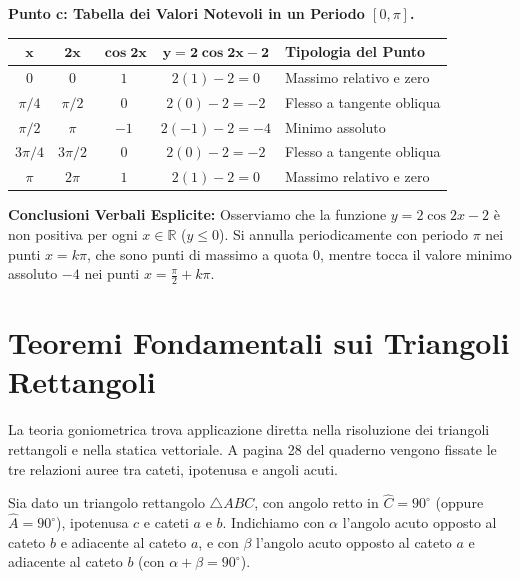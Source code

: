 \documentclass[11pt,a4paper,oneside]{report}
\begin{document}
\begin{dimostrazione}
\textbf{Punto c: Tabella dei Valori Notevoli in un Periodo $[0, \pi]$.}
\begin{center}
\begin{tabular}{c|c|c|c|l}
\toprule
$\mathbf{x}$ & $\mathbf{2x}$ & $\mathbf{\cos 2x}$ & $\mathbf{y = 2\cos 2x - 2}$ & \textbf{Tipologia del Punto} \\
\midrule
$0$ & $0$ & $1$ & $2(1) - 2 = 0$ & Massimo relativo e zero \\
$\pi/4$ & $\pi/2$ & $0$ & $2(0) - 2 = -2$ & Flesso a tangente obliqua \\
$\pi/2$ & $\pi$ & $-1$ & $2(-1) - 2 = -4$ & Minimo assoluto \\
$3\pi/4$ & $3\pi/2$ & $0$ & $2(0) - 2 = -2$ & Flesso a tangente obliqua \\
$\pi$ & $2\pi$ & $1$ & $2(1) - 2 = 0$ & Massimo relativo e zero \\
\bottomrule
\end{tabular}
\end{center}

\textbf{Conclusioni Verbali Esplicite:}
Osserviamo che la funzione $y = 2\cos 2x - 2$ è non positiva per ogni $x \in \mathbb{R}$ ($y \le 0$). Si annulla periodicamente con periodo $\pi$ nei punti $x = k\pi$, che sono punti di massimo a quota $0$, mentre tocca il valore minimo assoluto $-4$ nei punti $x = \frac{\pi}{2} + k\pi$.
\end{dimostrazione}


\section{Teoremi Fondamentali sui Triangoli Rettangoli}
La teoria goniometrica trova applicazione diretta nella risoluzione dei triangoli rettangoli e nella statica vettoriale.
A pagina 28 del quaderno vengono fissate le tre relazioni auree tra cateti, ipotenusa e angoli acuti.

Sia dato un triangolo rettangolo $\triangle ABC$, con angolo retto in $\hat{C} = 90^\circ$ (oppure $\hat{A} = 90^\circ$), ipotenusa $c$ e cateti $a$ e $b$. Indichiamo con $\alpha$ l'angolo acuto opposto al cateto $b$ e adiacente al cateto $a$, e con $\beta$ l'angolo acuto opposto al cateto $a$ e adiacente al cateto $b$ (con $\alpha + \beta = 90^\circ$).
\end{document}
